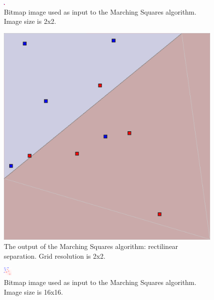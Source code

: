 \documentclass[12pt]{article}
\begin{document}
\begin{figure} 
\centering
  \includegraphics[width = 3 in]{2_res_image.png}
  \caption{Bitmap image used as input to the Marching Squares algorithm.
Image size is 2x2.
}
\end{figure}


\begin{figure} 
\centering
  \includegraphics[width = 3 in]{2_res.png}
  \caption{The output of the Marching Squares algorithm: rectilinear separation. Grid resolution is 2x2.
}
\end{figure}






\begin{figure} 
\centering
  \includegraphics[width = 3 in]{16_res_image.png}
  \caption{Bitmap image used as input to the Marching Squares algorithm.
Image size is 16x16.
}
\end{figure}
\end{document}
